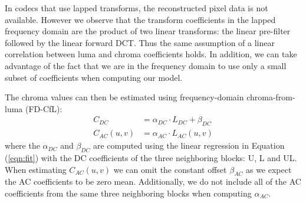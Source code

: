 \documentclass[a4paper]{spie}  %
\begin{document}
In codecs that use lapped transforms, the reconstructed pixel data is not
 available.
However we observe that the transform coefficients in the lapped frequency
 domain are the product of two linear transforms: the linear pre-filter
 followed by the linear forward DCT.
Thus the same assumption of a linear correlation between luma and chroma
 coefficients holds.
In addition, we can take advantage of the fact that we are in the frequency
 domain to use only a small subset of coefficients when computing our model.

The chroma values can then be estimated using frequency-domain chroma-from-luma
 (FD-CfL):
\begin{align*}
C_{DC} &= \alpha_{DC}\cdot L_{DC} + \beta_{DC} \\
C_{AC}(u,v) &= \alpha_{AC}\cdot L_{AC}(u,v)
\end{align*}
where the $\alpha_{DC}$ and $\beta_{DC}$ are computed using the linear
 regression in Equation (\ref{eqn:fit}) with the DC coefficients of the three
 neighboring blocks: U, L and UL.
When estimating $C_{AC}(u,v)$ we can omit the constant offset $\beta_{AC}$
 as we expect the AC coefficients to be zero mean.
Additionally, we do not include all of the AC coefficients from the same three
 neighboring blocks when computing $\alpha_{AC}$.
\end{document}
